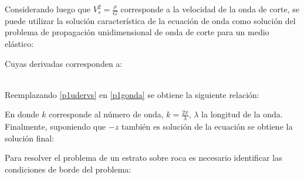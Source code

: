 Considerando luego que $V_s^2=\frac{\rho}{G}$ corresponde a la velocidad de la onda de corte, se puede utilizar la solución característica de la ecuación de onda como solución del problema de propagación unidimensional de onda de corte para un medio elástico:


Cuyas derivadas corresponden a:

\\

Reemplazando \eqref{p1udervs} en \eqref{p1gonda} se obtiene la siguiente relación:


En donde $k$ corresponde al número de onda, $k = \frac{2\pi}{\lambda}$, $\lambda$ la longitud de la onda. Finalmente, suponiendo que $-z$ también es solución de la ecuación se obtiene la solución final:


Para resolver el problema de un estrato sobre roca es necesario identificar las condiciones de borde del problema:

